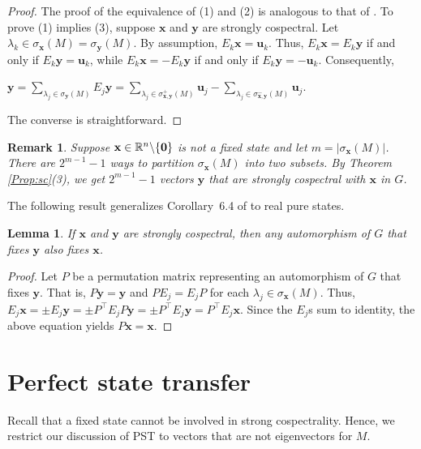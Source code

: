 \documentclass[11pt]{article}
\newtheorem{lemma}[theorem]{Lemma}
\newtheorem{remark}[theorem]{Remark}
\newcommand{\zero}{{\bf{0}}}
\newcommand{\bx}{\mathbf x}
\newcommand{\by}{\mathbf y}
\newcommand{\bu}{\mathbf u}
\def\R{\mathbb{R}}
\begin{document}
\begin{proof}
The proof of the equivalence of (1) and (2) is analogous to that of \cite[Theorem 10.2]{GodsilSmith2024}. To prove (1) implies (3), suppose $\bx$ and $\by$ are strongly cospectral. Let $\lambda_k\in\sigma_{\bx}(M)=\sigma_{\by}(M)$. By assumption, $E_k\bx=\bu_k$. Thus, $E_k\bx=E_k\by$ if and only if $E_k\by=\bu_k$, while $E_k\bx=-E_k\by$ if and only if $E_k\by=-\bu_k$. Consequently,
\begin{center}
$\displaystyle\by=\sum_{\lambda_j\in\sigma_{\by}(M)}E_j\by=\sum_{\lambda_j\in \sigma_{\bx,\by}^{+}(M)}\bu_j-\sum_{\lambda_j\in \sigma_{\bx,\by}^{-}(M)}\bu_j$.
\end{center}
The converse is straightforward.
\end{proof}

\begin{remark}
\label{numberofpartitions}
Suppose $\bx\in \R^n\backslash\{\zero\}$ is not a fixed state and let $m=|\sigma_{\bx}(M)|$. There are $2^{m-1}-1$ ways to partition $\sigma_{\bx}(M)$ into two subsets. By Theorem \ref{Prop:sc}(3), we get $2^{m-1}-1$ vectors $\by$ that are strongly cospectral with $\bx$ in $G$. 
\end{remark}

The following result generalizes Corollary~6.4 of \cite{GodsilSmith2024} to real pure states.

\begin{lemma}
\label{Lem:autfix}
If $\bx$ and $\by$ are strongly cospectral, then any automorphism of $G$ that fixes $\by$ also fixes $\bx$.
\end{lemma}

\begin{proof}
Let $P$ be a permutation matrix representing an automorphism of $G$ that fixes $\by$. That is, $P\by=\by$ and $PE_j=E_jP$ for each $\lambda_j\in\sigma_{\bx}(M)$. Thus, $E_j\bx=\pm E_j\by=\pm P^\top E_jP\by=\pm P^\top E_j\by=P^\top E_j\bx$.
Since the $E_j$s sum to identity, the above equation yields $P\bx=\bx$.
\end{proof}


\section{Perfect state transfer}
\label{Sec:pst}

Recall that a fixed state cannot be involved in strong cospectrality. Hence, we restrict our discussion of PST to vectors that are not eigenvectors for $M$.
\end{document}
